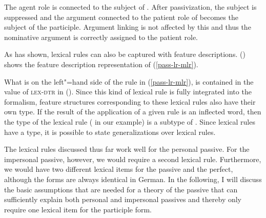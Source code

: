 \zl
The agent role is connected to the subject of . After passivization, the subject is suppressed and the argument connected to
the patient role of  becomes the subject of the participle. Argument linking is not affected by this and thus the nominative argument is
correctly assigned to the patient role.

As \citet{Meurers2001a} has shown, lexical rules can also be captured with feature
descriptions.\label{pageref-lr-mit-dtr} () shows the feature description representation of (\ref{pass-lr-mlr}).
\begin{figure}
\ea
\label{passiv-lr-mit-dtr}
\z
\vspace{-\baselineskip}
\end{figure}%
What is on the left"=hand side of the rule in (\ref{pass-lr-mlr}), is contained in the value of \textsc{lex-dtr} in ().
Since this kind of lexical rule is fully integrated into the formalism, feature structures corresponding to these lexical rules also have their own
type. If the result of the application of a given rule is an inflected word, then the type of the lexical rule ( in our example)
is a subtype of . Since lexical rules have a type, it is possible to state generalizations over lexical rules.

The lexical rules discussed thus far work well for the personal passive. For the impersonal passive,
however, we would require a second lexical rule. Furthermore, we would have two different lexical
items for the passive and the perfect, although the forms are always identical in German.  In the following,
I will discuss the basic assumptions that are needed for a theory of the passive that can sufficiently
explain both personal and impersonal passives and thereby only require one lexical item for the
participle form.

